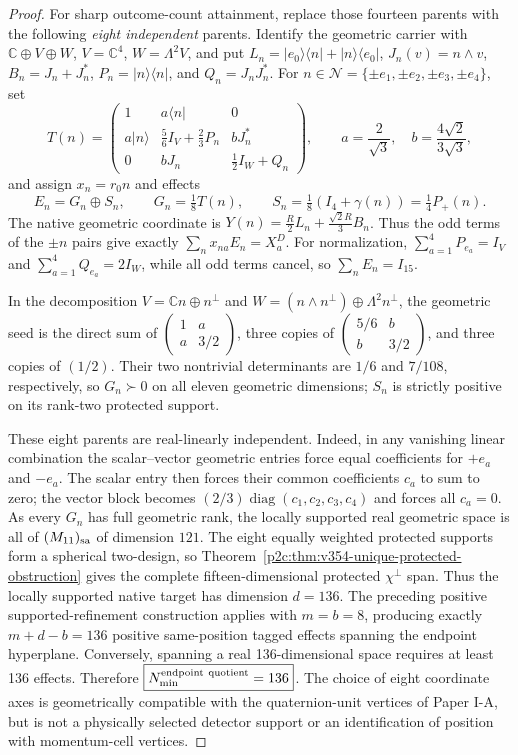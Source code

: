 \documentclass[12pt,a4paper]{article}
\begin{document}
\begin{proof}
For sharp outcome-count attainment, replace those fourteen parents with
the following \emph{eight independent} parents. Identify the geometric
carrier with $\mathbb C\oplus V\oplus W$, $V=\mathbb C^4$,
$W=\Lambda^2 V$, and put
$L_n=|e_0\rangle\langle n|+|n\rangle\langle e_0|$,
$J_n(v)=n\wedge v$, $B_n=J_n+J_n^*$,
$P_n=|n\rangle\langle n|$, and $Q_n=J_nJ_n^*$.
For $n\in\mathcal N=\{\pm e_1,\pm e_2,\pm e_3,\pm e_4\}$, set
\[
T(n)=\begin{pmatrix}
1 & a\langle n| & 0\\
a|n\rangle & \frac56 I_V+\frac23P_n & bJ_n^*\\
0 & bJ_n & \frac12 I_W+Q_n
\end{pmatrix},\qquad
a=\frac2{\sqrt3},\quad b=\frac{4\sqrt2}{3\sqrt3},
\]
and assign $x_n=r_0n$ and effects
\[
E_n=G_n\oplus S_n,\qquad
G_n=\tfrac18T(n),\qquad
S_n=\tfrac18(I_4+\gamma(n))=\tfrac14P_+(n).
\]
The native geometric coordinate is
$Y(n)=\frac R2L_n+\frac{\sqrt2R}{3}B_n$. Thus the odd terms
of the $\pm n$ pairs give exactly $\sum_nx_{na}E_n=X_a^D$.
For normalization, $\sum_{a=1}^4P_{e_a}=I_V$ and
$\sum_{a=1}^4Q_{e_a}=2I_W$, while all odd terms cancel,
so $\sum_nE_n=I_{15}$.

In the decomposition $V=\mathbb Cn\oplus n^\perp$ and
$W=(n\wedge n^\perp)\oplus\Lambda^2n^\perp$,
the geometric seed is the direct sum of
$\left(\begin{smallmatrix}1&a\\a&3/2\end{smallmatrix}\right)$,
three copies of
$\left(\begin{smallmatrix}5/6&b\\b&3/2\end{smallmatrix}\right)$,
and three copies of $(1/2)$. Their two nontrivial determinants are
$1/6$ and $7/108$, respectively, so $G_n\succ0$ on all eleven
geometric dimensions; $S_n$ is strictly positive on its rank-two
protected support.

These eight parents are real-linearly independent. Indeed, in any
vanishing linear combination the scalar--vector geometric entries
force equal coefficients for $+e_a$ and $-e_a$. The scalar entry then
forces their common coefficients $c_a$ to sum to zero; the vector
block becomes $(2/3)\operatorname{diag}(c_1,c_2,c_3,c_4)$ and
forces all $c_a=0$.
As every $G_n$ has full geometric rank, the locally supported real
geometric space is all of $(M_{11})_{\rm sa}$ of dimension $121$.
The eight equally weighted protected supports form a spherical
two-design, so Theorem~\ref{p2c:thm:v354-unique-protected-obstruction}
gives the complete fifteen-dimensional protected $\chi^\perp$ span.
Thus the locally supported native target has dimension $d=136$.
The preceding positive supported-refinement construction applies with
$m=b=8$, producing exactly $m+d-b=136$ positive same-position tagged
effects spanning the endpoint hyperplane. Conversely, spanning a real
136-dimensional space requires at least 136 effects. Therefore
$\boxed{N_{\min}^{\rm endpoint\ quotient}=136}$.
The choice of eight coordinate axes is geometrically compatible with
the quaternion-unit vertices of Paper I-A, but is not a physically
selected detector support or an identification of position with
momentum-cell vertices.


\end{proof}
\end{document}

